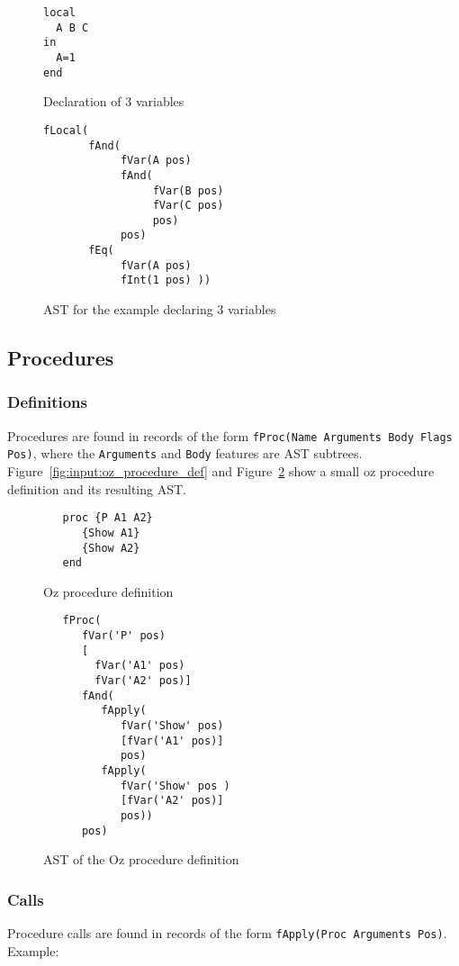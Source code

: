\documentclass[a4paper]{memoir}
\begin{document}
\begin{figure}
\begin{lstlisting}
local
  A B C
in
  A=1
end
\end{lstlisting}
\caption{Declaration of 3 variables}
\label{fig:input:decls_oz}
\begin{lstlisting}
fLocal(
       fAnd(
            fVar(A pos) 
            fAnd(
                 fVar(B pos) 
                 fVar(C pos) 
                 pos) 
            pos) 
       fEq( 
            fVar(A pos) 
            fInt(1 pos) ))
\end{lstlisting}
\caption{AST for the example declaring 3 variables}
\label{fig:input:decls}
\end{figure}


\subsection{Procedures}\label{sec:input:procedures}
\subsubsection{Definitions}
Procedures are found in records of the form \lstinline!fProc(Name Arguments Body Flags Pos)!, 
where the \lstinline!Arguments! and \lstinline!Body! features are AST subtrees. 
Figure~\ref{fig:input:oz_procedure_def} and Figure~\ref{fig:input:ast_procedure_def} show a small oz procedure definition and its resulting AST.
\begin{figure}[ht]
\begin{lstlisting}
   proc {P A1 A2}
      {Show A1}
      {Show A2}
   end
\end{lstlisting}
\caption{Oz procedure definition}
\label{fig:input:oz_procedure_def}

\begin{lstlisting}
   fProc(
      fVar('P' pos)
      [
        fVar('A1' pos)
        fVar('A2' pos)]
      fAnd(
         fApply(
            fVar('Show' pos)
            [fVar('A1' pos)]
            pos)
         fApply(
            fVar('Show' pos )
            [fVar('A2' pos)]
            pos))
      pos)
\end{lstlisting}
\caption{AST of the Oz procedure definition}
\label{fig:input:ast_procedure_def}
\end{figure}



\subsubsection{Calls}
Procedure calls are found in records of the form 
\lstinline!fApply(Proc Arguments Pos)!. 
Example:
\end{document}
